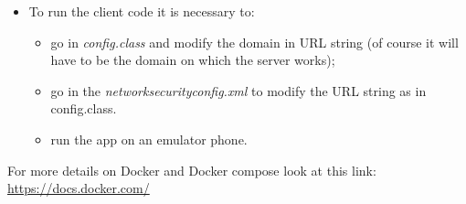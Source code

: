 \begin{itemize}
	
	\item To run the client code it is necessary to:
		\begin{itemize}
			\item go in \textit{config.class} and modify the domain in URL string (of course it will have to be the domain on 					which the server works);
			\item go in the  \textit{networksecurityconfig.xml}  to modify the URL string as in config.class.
			\item run the app on an emulator phone.
		\end{itemize} 
\end{itemize}

For more details on Docker and Docker compose look at this link:\\
\url{https://docs.docker.com/}
